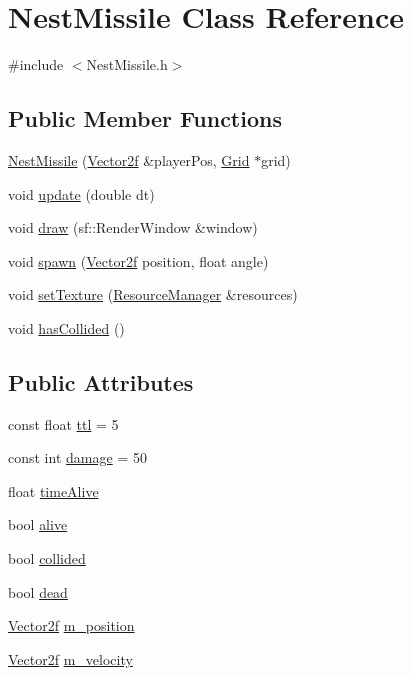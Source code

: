 \hypertarget{class_nest_missile}{}\section{Nest\+Missile Class Reference}
\label{class_nest_missile}


{\ttfamily \#include $<$Nest\+Missile.\+h$>$}

\subsection*{Public Member Functions}
\begin{DoxyCompactItemize}
\item 
\mbox{\hyperlink{class_nest_missile_a247f13ab901201350105cd06c42cf4bc}{Nest\+Missile}} (\mbox{\hyperlink{class_vector2f}{Vector2f}} \&player\+Pos, \mbox{\hyperlink{class_grid}{Grid}} $\ast$grid)
\item 
void \mbox{\hyperlink{class_nest_missile_a04925ab3da63f65253bf47d809222367}{update}} (double dt)
\item 
void \mbox{\hyperlink{class_nest_missile_af858a9e01982e6e10c2745c31718a611}{draw}} (sf\+::\+Render\+Window \&window)
\item 
void \mbox{\hyperlink{class_nest_missile_ad4a5ec72363fb7a16ac85b8f05bbcadc}{spawn}} (\mbox{\hyperlink{class_vector2f}{Vector2f}} position, float angle)
\item 
void \mbox{\hyperlink{class_nest_missile_a1a66ea6e80bd6cc96f08c2c7ced52833}{set\+Texture}} (\mbox{\hyperlink{class_resource_manager}{Resource\+Manager}} \&resources)
\item 
void \mbox{\hyperlink{class_nest_missile_a8594c06cd3421068518862e155dd07f8}{has\+Collided}} ()
\end{DoxyCompactItemize}
\subsection*{Public Attributes}
\begin{DoxyCompactItemize}
\item 
const float \mbox{\hyperlink{class_nest_missile_a51e665742f8a19c90f533bed00149876}{ttl}} = 5
\item 
const int \mbox{\hyperlink{class_nest_missile_a3555ba31ea53907ad1861343e86de153}{damage}} = 50
\item 
float \mbox{\hyperlink{class_nest_missile_a5780098c2ece04024fe80f198326afef}{time\+Alive}}
\item 
bool \mbox{\hyperlink{class_nest_missile_ae5d58fc3c25e7b328ea3341902678330}{alive}}
\item 
bool \mbox{\hyperlink{class_nest_missile_a327592403bd6a9c62e6d8ed69cc81704}{collided}}
\item 
bool \mbox{\hyperlink{class_nest_missile_ae0882f8ef7f3381a9095974f46dd9c5d}{dead}}
\item 
\mbox{\hyperlink{class_vector2f}{Vector2f}} \mbox{\hyperlink{class_nest_missile_a30712497be18b5c46fe96d982cda0f1c}{m\+\_\+position}}
\item 
\mbox{\hyperlink{class_vector2f}{Vector2f}} \mbox{\hyperlink{class_nest_missile_a3bdbbd200131b67ba061f17f0303455b}{m\+\_\+velocity}}
\end{DoxyCompactItemize}


